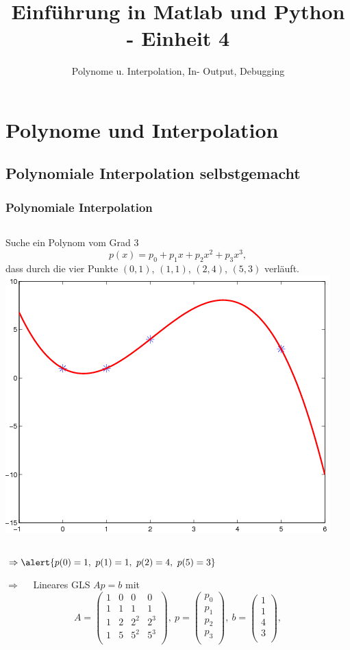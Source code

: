\documentclass[hyperref={xetex}]{beamer}
\title{Einführung in Matlab und Python - Einheit 4}
\subtitle{Polynome u. Interpolation, In- Output, Debugging}
\begin{document}
\titlepage

\section{Polynome und Interpolation}

\subsection{Polynomiale Interpolation selbstgemacht}
% 
% 
\begin{frame}[fragile]\frametitle{Polynomiale Interpolation}
\begin{columns}[b]
Suche ein Polynom vom Grad 3
\[ p(x)= p_0 +p_1 x +p_2 x^2 +p_3 x^3,  \]
 dass durch die vier Punkte
$(0,1)$, $(1,1)$, $(2,4)$, $(5,3)$
verläuft.
\includegraphics[width=\textwidth]{figures/grafik_6}
\end{columns}
$\Rightarrow  \alert{ p(0)=1, \ p(1)=1, \ p(2)=4, \ p(5)=3}$

$\Rightarrow \quad$ Lineares GLS \alert{ $Ap=b$} mit
{\scriptsize \[ A= \left( \begin{array}{cccc}
1 & 0 & 0 & 0\\
1 & 1 & 1 & 1\\
1 & 2 & 2^2 & 2^3 \\
1 & 5 & 5^2 & 5^3 \\
\end{array} \right), \
p=\left( \begin{array}{c} 
p_0 \\ p_1 \\ p_2 \\p_3\\
\end{array} \right),
\
b=\left( \begin{array}{c} 
1 \\ 1 \\ 4 \\ 3\\
\end{array} \right),
\]}  
\end{frame}
\end{document}
